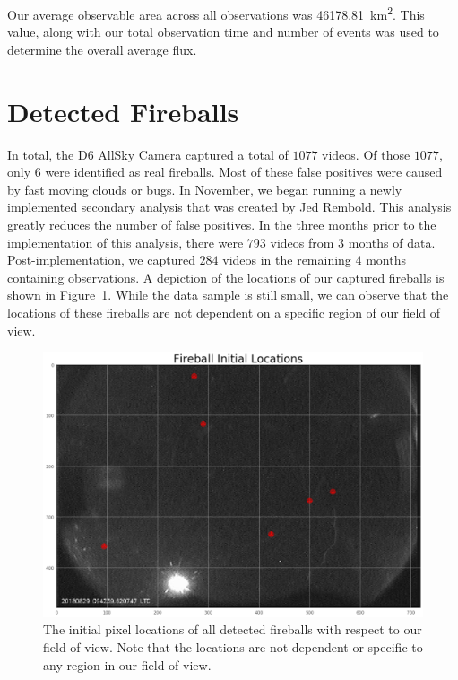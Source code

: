 Our average observable area across all observations was  \SI{46178.81}{\square\kilo\meter}.
This value, along with our total observation time and number of events was used to determine the overall average flux.

\section{Detected Fireballs}

In total, the D6 AllSky Camera captured a total of $1077$ videos.  
Of those $1077$, only $6$ were identified as real fireballs.
Most of these false positives were caused by fast moving clouds or bugs.
In November, we began running a newly implemented secondary analysis that was created by Jed Rembold.
This analysis greatly reduces the number of false positives.
In the three months prior to the implementation of this analysis, there were $793$ videos from $3$ months of data.
Post-implementation, we captured $284$ videos in the remaining $4$ months containing observations.
A depiction of the locations of our captured fireballs is shown in Figure~\ref{fireball_locs}.
While the data sample is still small, we can observe that the locations of these fireballs are not dependent on a specific region of our field of view.  

\begin{figure}[ht!]
  \centering
  \includegraphics[scale=0.25]{images/fireball_initlocs.png}
  \caption[The initial pixel locations of all detected fireballs with respect to our field of view.]{The initial pixel locations of all detected fireballs with respect to our field of view.  Note that the locations are not dependent or specific to any region in our field of view.}
  \label{fireball_locs}
\end{figure}

